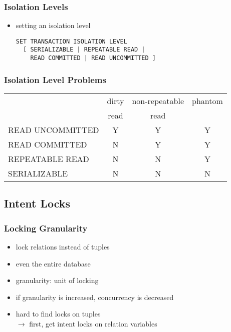 \documentclass[dvipsnames]{beamer}
\theoremstyle{plain}
\begin{document}
\begin{frame}[fragile]
  \frametitle{Isolation Levels}

  \begin{itemize}
    \item setting an isolation level
    \begin{lstlisting}
SET TRANSACTION ISOLATION LEVEL
  [ SERIALIZABLE | REPEATABLE READ |
    READ COMMITTED | READ UNCOMMITTED ]
    \end{lstlisting}
  \end{itemize}
\end{frame}

\begin{frame}[fragile]
  \frametitle{Isolation Level Problems}

  \begin{table}
    \begin{tabular}{|l||c|c|c|}\hline
                 & dirty & non-repeatable & phantom\\
                 & read  & read           &        \\\hline\hline
READ UNCOMMITTED & Y     & Y              & Y      \\\hline
READ COMMITTED   & N     & Y              & Y      \\\hline
REPEATABLE READ  & N     & N              & Y      \\\hline
SERIALIZABLE     & N     & N              & N      \\\hline
    \end{tabular}
  \end{table}
\end{frame}

\subsection{Intent Locks}

\begin{frame}
  \frametitle{Locking Granularity}

  \begin{itemize}
    \item lock relations instead of tuples
    \item even the entire database

    \medskip
    \item granularity: unit of locking
    \item if granularity is increased, concurrency is decreased

    \pause
    \medskip
    \item hard to find locks on tuples\\
      $\rightarrow$ first, get \alert{intent locks} on relation variables
  \end{itemize}
\end{frame}
\end{document}
